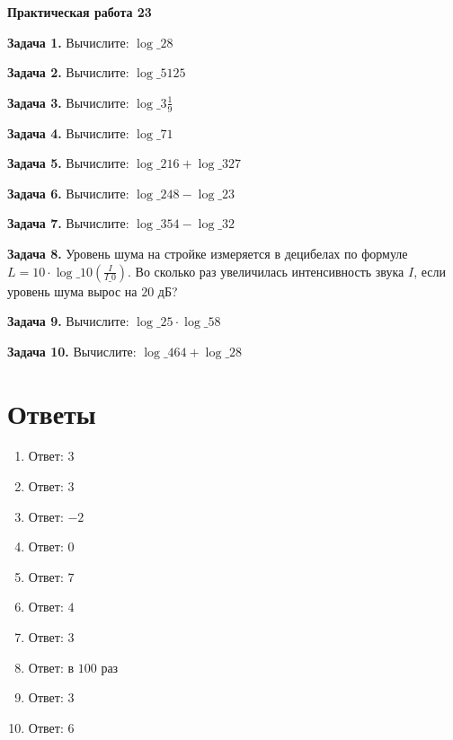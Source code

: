 \documentclass{umk-matematika}
\begin{document}
\begin{center}
{\Large\bfseries Практическая работа 23}
\end{center}
\vspace{0.5cm}

\textbf{Задача 1.} Вычислите: $\log\_{2} 8$\par\vspace{10pt}
\textbf{Задача 2.} Вычислите: $\log\_{5} 125$\par\vspace{10pt}
\textbf{Задача 3.} Вычислите: $\log\_{3} \frac{1}{9}$\par\vspace{10pt}
\textbf{Задача 4.} Вычислите: $\log\_{7} 1$\par\vspace{10pt}
\textbf{Задача 5.} Вычислите: $\log\_{2} 16 + \log\_{3} 27$\par\vspace{10pt}
\textbf{Задача 6.} Вычислите: $\log\_{2} 48 - \log\_{2} 3$\par\vspace{10pt}
\textbf{Задача 7.} Вычислите: $\log\_{3} 54 - \log\_{3} 2$\par\vspace{10pt}
\textbf{Задача 8.} Уровень шума на стройке измеряется в децибелах по формуле $L = 10 \cdot \log\_{10} \left(\frac{I}{I\_0}\right)$. Во сколько раз увеличилась интенсивность звука $I$, если уровень шума вырос на $20$ дБ?\par\vspace{10pt}
\textbf{Задача 9.} Вычислите: $\log\_{2} 5 \cdot \log\_{5} 8$\par\vspace{10pt}
\textbf{Задача 10.} Вычислите: $\log\_{4} 64 + \log\_{2} 8$\par\vspace{10pt}
\newpage
\section*{Ответы}

\begin{enumerate}
  \item Ответ: $3$
  \item Ответ: $3$
  \item Ответ: $-2$
  \item Ответ: $0$
  \item Ответ: $7$
  \item Ответ: $4$
  \item Ответ: $3$
  \item Ответ: в $100$ раз
  \item Ответ: $3$
  \item Ответ: $6$
\end{enumerate}
\end{document}
